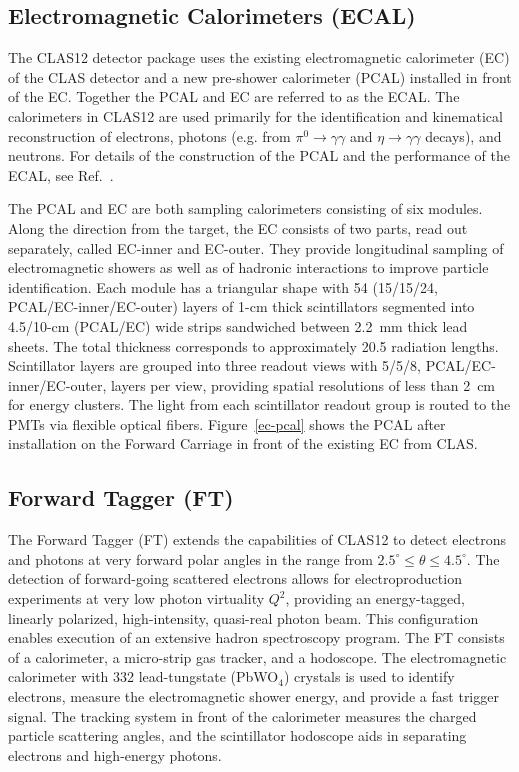 \documentclass[final,3p,twocolumn]{elsarticle}
\begin{document}
\subsection{Electromagnetic Calorimeters (ECAL)}

The CLAS12 detector package uses the existing electromagnetic calorimeter (EC) of the CLAS detector
\cite{Amarian:2001zs} and a new pre-shower calorimeter (PCAL) installed in front of the EC. Together the
PCAL and EC are referred to as the ECAL. The calorimeters in CLAS12 are used primarily for the identification
and kinematical reconstruction of electrons, photons (e.g. from $\pi^0 \to \gamma \gamma$ and
$\eta \to \gamma  \gamma$ decays), and neutrons. For details of the construction of the PCAL and the
performance of the ECAL, see Ref.~\cite{ECAL}. 

The PCAL and EC are both sampling calorimeters consisting of six modules. Along the direction from the target,
the EC consists of two parts, read out separately, called EC-inner and EC-outer. They provide longitudinal sampling
of electromagnetic showers as well as of hadronic interactions to improve particle identification. Each module has a
triangular shape with 54 (15/15/24, PCAL/EC-inner/EC-outer) layers of 1-cm thick scintillators segmented into
4.5/10-cm (PCAL/EC) wide strips sandwiched between 2.2~mm thick lead sheets. The total thickness corresponds to
approximately 20.5 radiation lengths. Scintillator layers are grouped into three readout views with 5/5/8,
PCAL/EC-inner/EC-outer, layers per view, providing spatial resolutions of less than 2~cm for energy clusters. The
light from each scintillator readout group is routed to the PMTs via flexible optical fibers. Figure~\ref{ec-pcal}
shows the PCAL after installation on the Forward Carriage in front of the existing EC from CLAS.

\subsection{Forward Tagger (FT)}

The Forward Tagger (FT) extends the capabilities of CLAS12 to detect electrons and photons at very forward
polar angles in the range from $2.5^\circ \le \theta \le 4.5^\circ$. The detection of forward-going scattered
electrons allows for electroproduction experiments at very low photon virtuality $Q^2$, providing an
energy-tagged, linearly polarized, high-intensity, quasi-real photon beam. This configuration enables execution of
an extensive hadron spectroscopy program. The FT consists of a calorimeter, a micro-strip gas tracker, and a
hodoscope. The electromagnetic calorimeter with 332 lead-tungstate (PbWO$_4$) crystals is used to identify
electrons,  measure the electromagnetic shower energy, and provide a fast trigger signal. The tracking system in
front of the calorimeter measures the charged particle scattering angles, and the scintillator hodoscope aids in
separating electrons and high-energy photons.
\end{document}
